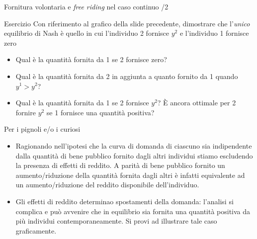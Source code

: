\documentclass[aspectratio=64,11pt]{beamer}
\begin{document}
\begin{frame}{Fornitura volontaria e \emph{free riding} nel caso continuo /2}
\begin{block}{Esercizio}
\small
Con riferimento al grafico della slide precedente, dimostrare che l'\emph{unico}
equilibrio di Nash è quello in cui l'individuo 2 fornisce $y^{2}$ e
l'individuo 1 fornisce zero
\end{block}
\small
\begin{itemize}
\item Qual è la quantità fornita da 1 se 2 fornisce zero?
\item Qual è la quantità fornita da 2 in aggiunta a quanto fornito da 1
quando $y^{1}>y^{2}$?
\item Qual è la quantità fornita da 1 se 2 fornisce $y^{2}$? È ancora
ottimale per 2 fornire $y^{2}$ se 1 fornisce una quantità positiva?
\end{itemize}
\begin{block}{Per i pignoli e/o i curiosi}
\footnotesize
\begin{itemize}
\item Ragionando nell'ipotesi che la curva di domanda di ciascuno sia
  indipendente dalla quantità di bene pubblico fornito dagli altri individui
  stiamo escludendo la presenza di effetti di reddito. A parità di bene
  pubblico fornito un aumento/riduzione della quantità fornita dagli altri è
  infatti equivalente ad un aumento/riduzione del reddito disponibile
  dell'individuo.
\item Gli effetti di reddito determinao spostamenti della domanda: l'analisi
  si complica e può avvenire che in equilibrio sia fornita una quantità
  positiva da più individui contemporaneamente. Si provi ad illustrare tale
  caso graficamente.
\end{itemize}
\end{block}
\end{frame}
\end{document}
